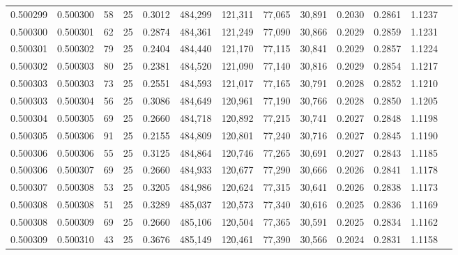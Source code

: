 \begin{tabular}{rrrrrrrrrrrrr}
0.500299 & 0.500300 &  58 &  25 &                                     0.3012 & 484,299 & 121,311 &  77,065 &  30,891 & 0.2030 & 0.2861 & 1.1237 \\
0.500300 & 0.500301 &  62 &  25 &                                     0.2874 & 484,361 & 121,249 &  77,090 &  30,866 & 0.2029 & 0.2859 & 1.1231 \\
0.500301 & 0.500302 &  79 &  25 &                                     0.2404 & 484,440 & 121,170 &  77,115 &  30,841 & 0.2029 & 0.2857 & 1.1224 \\
0.500302 & 0.500303 &  80 &  25 &                                     0.2381 & 484,520 & 121,090 &  77,140 &  30,816 & 0.2029 & 0.2854 & 1.1217 \\
0.500303 & 0.500303 &  73 &  25 &                                     0.2551 & 484,593 & 121,017 &  77,165 &  30,791 & 0.2028 & 0.2852 & 1.1210 \\
0.500303 & 0.500304 &  56 &  25 &                                     0.3086 & 484,649 & 120,961 &  77,190 &  30,766 & 0.2028 & 0.2850 & 1.1205 \\
0.500304 & 0.500305 &  69 &  25 &                                     0.2660 & 484,718 & 120,892 &  77,215 &  30,741 & 0.2027 & 0.2848 & 1.1198 \\
0.500305 & 0.500306 &  91 &  25 &                                     0.2155 & 484,809 & 120,801 &  77,240 &  30,716 & 0.2027 & 0.2845 & 1.1190 \\
0.500306 & 0.500306 &  55 &  25 &                                     0.3125 & 484,864 & 120,746 &  77,265 &  30,691 & 0.2027 & 0.2843 & 1.1185 \\
0.500306 & 0.500307 &  69 &  25 &                                     0.2660 & 484,933 & 120,677 &  77,290 &  30,666 & 0.2026 & 0.2841 & 1.1178 \\
0.500307 & 0.500308 &  53 &  25 &                                     0.3205 & 484,986 & 120,624 &  77,315 &  30,641 & 0.2026 & 0.2838 & 1.1173 \\
0.500308 & 0.500308 &  51 &  25 &                                     0.3289 & 485,037 & 120,573 &  77,340 &  30,616 & 0.2025 & 0.2836 & 1.1169 \\
0.500308 & 0.500309 &  69 &  25 &                                     0.2660 & 485,106 & 120,504 &  77,365 &  30,591 & 0.2025 & 0.2834 & 1.1162 \\
0.500309 & 0.500310 &  43 &  25 &                                     0.3676 & 485,149 & 120,461 &  77,390 &  30,566 & 0.2024 & 0.2831 & 1.1158 \\

\end{tabular}
